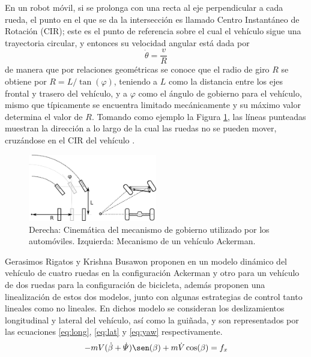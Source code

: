 \par En un robot móvil, si se prolonga con una recta al eje perpendicular a cada rueda, el punto en el que se da la intersección es llamado Centro Instantáneo de Rotación (CIR); este es el punto de referencia sobre el cual el vehículo sigue una trayectoria circular, y entonces su velocidad angular está dada por
\begin{equation}\label{eq:giro}
	\dot{\theta}=\frac{v}{R}
\end{equation}
de manera que por relaciones geométricas se conoce que el radio de giro $R$ se obtiene por $R=L/\tan(\varphi)$, teniendo a $L$ como la distancia entre los ejes frontal y trasero del vehículo, y a $\varphi$ como el ángulo de gobierno para el vehículo, mismo que típicamente se encuentra limitado mecánicamente y su máximo valor determina el valor de $R$. Tomando como ejemplo la Figura \ref{fig:CIR}, las líneas punteadas muestran la dirección a lo largo de la cual las ruedas no se pueden mover, cruzándose en el CIR del vehículo \cite{sicilianoRoboticsModellingPlanning2009, corkeRoboticsVisionControl2017}.
\begin{figure}[htbp!]
	\centering
	\includegraphics[width=0.5\textwidth]{./Figuras/Ackerman}
	\caption{Derecha: Cinemática del mecanismo de gobierno utilizado por los automóviles. Izquierda: Mecanismo de un vehículo Ackerman.}
	\label{fig:CIR}
\end{figure}
\par Gerasimos Rigatos y Krishna Busawon proponen en \cite{rigatosRoboticManipulatorsVehicles2018} un modelo dinámico del vehículo de cuatro ruedas en la configuración Ackerman y otro para un vehículo de dos ruedas para la configuración de bicicleta, además proponen una linealización de estos dos modelos, junto con algunas estrategias de control tanto lineales como no lineales. En dichos modelo se consideran los deslizamientos longitudinal y lateral del vehículo, así como la guiñada, y son representados por las ecuaciones \eqref{eq:long}, \eqref{eq:lat} y \eqref{eq:yaw} respectivamente.
\begin{equation} \label{eq:long}
	-mV(\dot{\beta}+\dot{\varPsi})\sen(\beta)+m\dot{V}\cos(\beta)=f_{x}
\end{equation}
